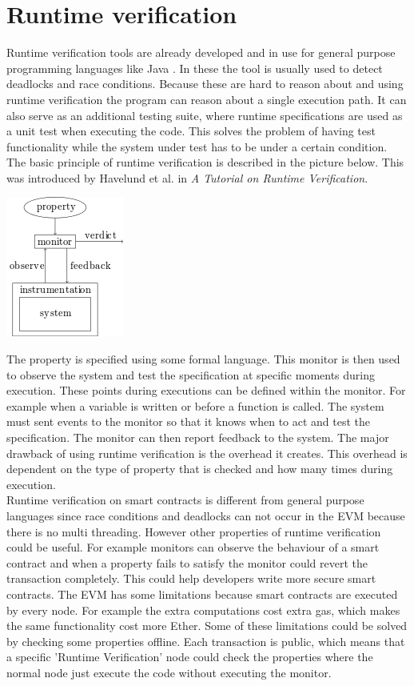 \documentclass[a4paper]{article}
\begin{document}
\section{Runtime verification}
Runtime verification tools are already developed and in use for general purpose programming languages like Java \cite{leavens2005design}. In these the tool is usually used to detect deadlocks and race conditions. Because these are hard to reason about and using runtime verification the program can reason about a single execution path. It can also serve as an additional testing suite, where runtime specifications are used as a unit test when executing the code. This solves the problem of having test functionality while the system under test has to be under a certain condition.\\
The basic principle of runtime verification is described in the picture below. This was introduced by Havelund et al. in \textit{A Tutorial on Runtime Verification}. 
\begin{center}
\includegraphics{resources/Runtime_Verification_Monitor.png}
\end{center}
The property is specified using some formal language. This monitor is then used to observe the system and test the specification at specific moments during execution. These points during executions can be defined within the monitor. For example when a variable is written or before a function is called. The system must sent events to the monitor so that it knows when to act and test the specification. The monitor can then report feedback to the system. The major drawback of using runtime verification is the overhead it creates. This overhead is dependent on the type of property that is checked and how many times during execution. \\
Runtime verification on smart contracts is different from general purpose languages since race conditions and deadlocks can not occur in the EVM because there is no multi threading. However other properties of runtime verification could be useful. For example monitors can observe the behaviour of a smart contract and when a property fails to satisfy the monitor could revert the transaction completely. This could help developers write more secure smart contracts. The EVM has some limitations because smart contracts are executed by every node. For example the extra computations cost extra gas, which makes the same functionality cost more Ether. Some of these limitations could be solved by checking some properties offline. Each transaction is public, which means that a specific 'Runtime Verification' node could check the properties where the normal node just execute the code without executing the monitor.
\end{document}
